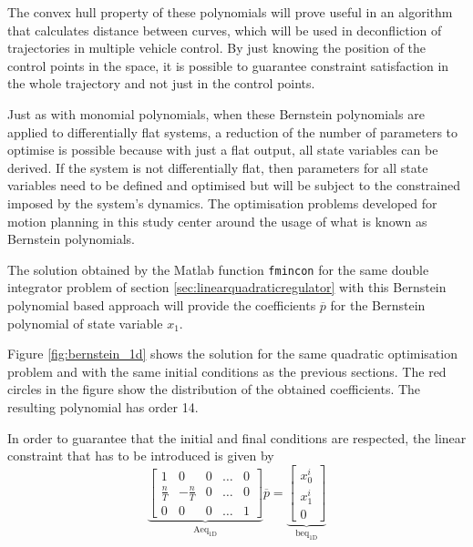 
The convex hull property of these polynomials will prove useful in an algorithm that calculates distance between curves, which will be used in deconfliction of trajectories in multiple vehicle control. By just knowing the position of the control points in the space, it is possible to guarantee constraint satisfaction in the whole trajectory and not just in the control points.

\par Just as with monomial polynomials, when these Bernstein polynomials are applied to differentially flat systems, a reduction of the number of parameters to optimise is possible because with just a flat output, all state variables can be derived. If the system is not differentially flat, then parameters for all state variables need to be defined and optimised but will be subject to the constrained imposed by the system's dynamics.
The optimisation problems developed for motion planning in this study center around the usage of what is known as Bernstein polynomials.

\par The solution obtained by the Matlab function \texttt{fmincon} for the same double integrator problem of section \ref{sec:linearquadraticregulator} with this Bernstein polynomial based approach will provide the coefficients $\overline{p}$ for the Bernstein polynomial of state variable $x_1$. 

\par Figure \ref{fig:bernstein_1d} shows the solution for the same quadratic optimisation problem and with the same initial conditions as the previous sections. The red circles in the figure show the distribution of the obtained coefficients. The resulting polynomial has order 14.

\par In order to guarantee that the initial and final conditions are respected, the linear constraint that has to be introduced is given by
\begin{equation}
    \label{eq:bern_equality}
    \underbrace{\begin{bmatrix}
        1 & 0 & 0 & \dots & 0 \\
        \frac{n}{T} & -\frac{n}{T} & 0 & \dots & 0 \\
        0 & 0 & 0 & \dots & 1 \end{bmatrix}}_{\text{Aeq}_{\text{1D}}} \overline{p} =
    \underbrace{\begin{bmatrix}
        x_0^i \\ x_1^i \\ 0\end{bmatrix}}_{\text{beq}_{\text{1D}}}
\end{equation}


